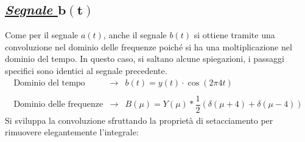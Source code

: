 \documentclass[a4paper]{article}
\begin{document}
	\subsection*{\textcolor{Green4}{\underline{\textbf{\emph{Segnale $\boldsymbol{b\left(t\right)}$}}}}}
		
	Come per il segnale $a\left(t\right)$, anche il segnale $b\left(t\right)$ si ottiene tramite una convoluzione nel dominio delle frequenze poiché si ha una moltiplicazione nel dominio del tempo. In questo caso, si saltano alcune spiegazioni, i passaggi specifici sono identici al segnale precedente.
	\begin{equation*}
		\begin{array}{lll}
			\text{Dominio del tempo} & \longrightarrow & b\left(t\right) = y\left(t\right) \cdot \cos\left(2\pi4t\right) \\
			\\
			\text{Dominio delle frequenze} & \longrightarrow & B\left(\mu\right) = Y\left(\mu\right) * \dfrac{1}{2}\left(\delta\left(\mu+4\right) + \delta\left(\mu-4\right)\right)
		\end{array}
	\end{equation*}
	\noindent
	Si sviluppa la convoluzione sfruttando la proprietà di setacciamento per rimuovere elegantemente l'integrale:
\end{document}
